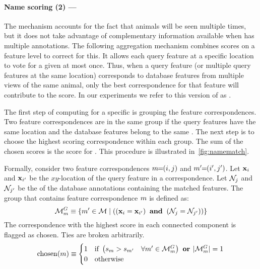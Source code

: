          \paragraph{Name scoring (2) --- \nsumprefix{}} %
            The \cscoring{} mechanism accounts for the fact that animals will be seen multiple times, but it does
              not take advantage of complementary information available when \aan{\name{}} has multiple
              annotations.
            The following aggregation mechanism combines scores on a feature level to correct for this.
            It allows each query feature at a specific location to vote for a given \name{} at most once.
            Thus, when a query feature (or multiple query features at the same location) corresponds to database
              features from multiple views of the same animal, only the best correspondence for that feature will
              contribute to the score.
            In our experiments we refer to this version of \namescoring{} as \nsum{}.

            The first step of computing \aan{\namescore{}} for a specific \name{} is grouping the feature
              correspondences.
            Two feature correspondences are in the same group if the query features have the same location and
              the database features belong to the same \name{}.
            The next step is to choose the highest scoring correspondence within each group.
            The sum of the chosen scores is the score for \aan{\name{}}.
            This procedure is illustrated in~\cref{fig:namematch}.

            \newcommand{\MatchesGroup}{\Matches^{G}}

            Formally, consider two feature correspondences $m\mkern-6mu=\mkern-6mu(i, j)$ and $m'\mkern-6mu=\mkern-6mu(i',
              j')$.
            Let $\mathbf{x}_{i}$ and $\mathbf{x}_{i'}$ be the $xy$-location of the query feature in a correspondence.
            Let $\mathcal{N}_{j}$ and $\mathcal{N}_{j'}$ be the \name{} of the database annotations containing the matched
              features.
            The group that contains feature correspondence $m$ is defined as:
            \begin{equation}
                \MatchesGroup_{\mI} \eqv \curly{\mII \in \Matches  \where
                \paren{
                    \paren{\pt_{\iI} \eq \pt_{\iII}} \AND 
                    \paren{\nid_{\jI} \eq \nid_{\jII}}
                }
            }
            \end{equation}
            The correspondence with the highest score in each connected component is flagged as chosen.
            Ties are broken arbitrarily.
            \begin{equation}
                \ischosen(\mI) \eqv 
                \bincase{
                \paren{
                    \fs_{\mI} > \fs_{\mII} 
                    \quad \forall \mII  \in \MatchesGroup_{\mI}
                } 
                \OR
                \card{\MatchesGroup_{\mI}} \eq 1
                }
            \end{equation}

